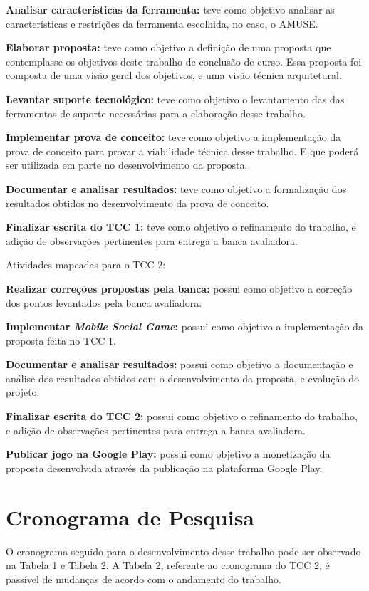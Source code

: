 \textbf{Analisar características da ferramenta:} teve como objetivo analisar as
características e restrições da ferramenta escolhida, no caso, o AMUSE.

\textbf{Elaborar proposta:} teve como objetivo a definição de uma proposta que
contemplasse os objetivos deste trabalho de conclusão de curso. Essa proposta foi
composta de uma visão geral dos objetivos, e uma visão técnica arquitetural.

\textbf{Levantar suporte tecnológico:} teve como objetivo o levantamento das
das ferramentas de suporte necessárias para a elaboração desse trabalho.

\textbf{Implementar prova de conceito:} teve como objetivo a implementação da
prova de conceito para provar a viabilidade técnica desse trabalho. E que poderá
ser utilizada em parte no desenvolvimento da proposta.

\textbf{Documentar e analisar resultados:} teve como objetivo a formalização dos
resultados obtidos no desenvolvimento da prova de conceito.

\textbf{Finalizar escrita do TCC 1:} teve como objetivo o refinamento do trabalho,
e adição de observações pertinentes para entrega a banca avaliadora.

Atividades mapeadas para o TCC 2:

\textbf{Realizar correções propostas pela banca:} possui como objetivo a correção
dos pontos levantados pela banca avaliadora.

\textbf{Implementar \textit{Mobile Social Game}:} possui como objetivo a
implementação da proposta feita no TCC 1.

\textbf{Documentar e analisar resultados:} possui como objetivo a documentação e
análise dos resultados obtidos com o desenvolvimento da proposta, e evolução do
projeto.

\textbf{Finalizar escrita do TCC 2:} possui como objetivo o refinamento do trabalho,
e adição de observações pertinentes para entrega a banca avaliadora.

\textbf{Publicar jogo na Google Play:} possui como objetivo a monetização da proposta
desenvolvida através da publicação na plataforma Google Play.


\section{Cronograma de Pesquisa}
\label{sec:cronograma}

O cronograma seguido para o desenvolvimento desse trabalho pode ser observado na Tabela 1 e Tabela 2. A Tabela 2, referente ao cronograma do TCC 2, é passível de mudanças de acordo com o andamento do trabalho.

